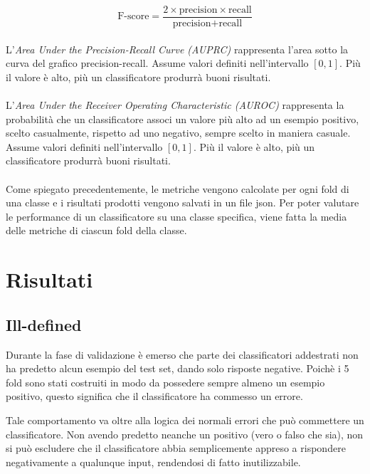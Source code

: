 \documentclass[12pt,a4paper,oneside,hidelinks]{report}
\begin{document}
\begin{equation}
\text{F-score} = \frac{2 \times \text{precision} \times \text{recall}}{\text{precision} + \text{recall}}
\end{equation}

\paragraph*{}
L'\textit{Area Under the Precision-Recall Curve (AUPRC)} rappresenta l'area sotto la curva del grafico precision-recall. Assume valori definiti nell'intervallo $[0,1]$. Più il valore è alto, più un classificatore produrrà buoni risultati.

\paragraph*{}
L'\textit{Area Under the Receiver Operating Characteristic (AUROC)} rappresenta la probabilità che un classificatore associ un valore più alto ad un esempio positivo, scelto casualmente, rispetto ad uno negativo, sempre scelto in maniera casuale. Assume valori definiti nell'intervallo $[0,1]$. Più il valore è alto, più un classificatore produrrà buoni risultati.

\paragraph*{}
Come spiegato precedentemente, le metriche vengono calcolate per ogni fold di una classe e i risultati prodotti vengono salvati in un file json. Per poter valutare le performance di un classificatore su una classe specifica, viene fatta la media delle metriche di ciascun fold della classe.

\section{Risultati}

\subsection{Ill-defined}
Durante la fase di validazione è emerso che parte dei classificatori addestrati non ha predetto alcun esempio del test set, dando solo risposte negative. Poichè i 5 fold sono stati costruiti in modo da possedere sempre almeno un esempio positivo, questo significa che il classificatore ha commesso un errore.

Tale comportamento va oltre alla logica dei normali errori che può commettere un classificatore. Non avendo predetto neanche un positivo (vero o falso che sia), non si può escludere che il classificatore abbia semplicemente appreso a rispondere negativamente a qualunque input, rendendosi di fatto inutilizzabile.
\end{document}
